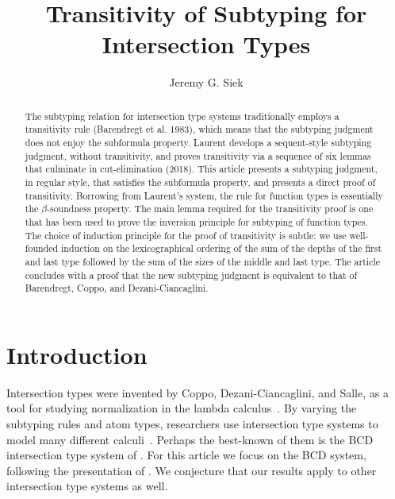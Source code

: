 \documentclass{article}
\title{Transitivity of Subtyping for Intersection Types}
\author{Jeremy G. Siek}
\begin{document}
\maketitle

\newcommand{\TOP}{\ensuremath{\mathtt{U}}}
\newcommand{\dom}[1]{\mathsf{dom}(#1)}
\newcommand{\cod}[1]{\mathsf{cod}(#1)}
\newcommand{\topP}[1]{\mathsf{top}(#1)}
\newcommand{\topInCod}[1]{\mathsf{topInCod}(#1)}
\newcommand{\depth}[1]{\mathsf{depth}(#1)}
\newcommand{\size}[1]{\mathsf{size}(#1)}


\begin{abstract}
  The subtyping relation for intersection type systems traditionally
  employs a transitivity rule (Barendregt et al. 1983), which means
  that the subtyping judgment does not enjoy the subformula property.
  Laurent develops a sequent-style subtyping judgment, without
  transitivity, and proves transitivity via a sequence of six lemmas
  that culminate in cut-elimination (2018). This article presents a
  subtyping judgment, in regular style, that satisfies the subformula
  property, and presents a direct proof of transitivity. Borrowing
  from Laurent's system, the rule for function types is essentially
  the $\beta$-soundness property.  The main lemma required for the
  transitivity proof is one that has been used to prove the inversion
  principle for subtyping of function types. The choice of induction
  principle for the proof of transitivity is subtle: we use
  well-founded induction on the lexicographical ordering of the sum of
  the depths of the first and last type followed by the sum of the
  sizes of the middle and last type. The article concludes with a
  proof that the new subtyping judgment is equivalent to that of
  Barendregt, Coppo, and Dezani-Ciancaglini.
\end{abstract}

\section{Introduction}

Intersection types were invented by Coppo, Dezani-Ciancaglini, and
Salle, as a tool for studying normalization in the lambda
calculus~\citep{Coppo:1979aa}. By varying the subtyping rules and atom
types, researchers use intersection type systems to model many
different
calculi~\citep{Coppo:1980ab,Coppo:1981aa,Engeler:1981aa,Coppo:1984aa,Honsell:1992aa,Abramsky:1993fk,Plotkin:1993ab,Honsell:1999aa,Ishihara:2002aa,Rocca:2004aa,Dezani-Ciancaglini:2005aa,Alessi:2006aa}.
Perhaps the best-known of them is the BCD intersection type system of
\citet{Barendregt:1983aa}. For this article we focus on the BCD
system, following the presentation of \citet{Barendregt:2013aa}.  We
conjecture that our results apply to other intersection type systems
as well.
\end{document}
